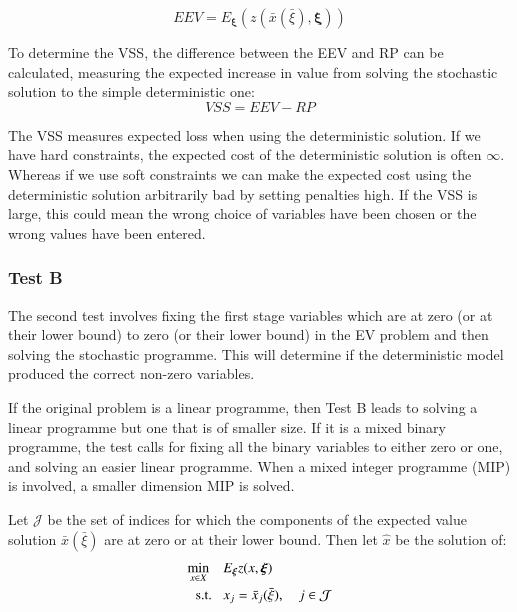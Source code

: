 \documentclass[../thesis.tex]{subfiles}
\begin{document}
\begin{equation}\label{eq:EEV}
    EEV = E_{\boldsymbol{\xi}} (z(\bar x (\bar \xi),\boldsymbol{\xi}))
\end{equation}

To determine the VSS, the difference between the EEV and RP can be calculated, measuring the expected increase in value from solving the stochastic solution to the simple deterministic one:
\begin{equation}\label{eq:VSS}
    VSS = EEV - RP
\end{equation}

The VSS measures expected loss when using the deterministic solution. If we have hard constraints, the expected cost of the deterministic solution is often $\infty$. Whereas if we use soft constraints we can make the expected cost using the deterministic solution arbitrarily bad by setting penalties high. If the VSS is large, this could mean the wrong choice of variables have been chosen or the wrong values have been entered.

\subsubsection{Test B}\label{sec:TestB}
The second test involves fixing the first stage variables which are at zero (or at their lower bound) to zero (or their lower bound) in the EV problem and then solving the stochastic programme. This will determine if the deterministic model produced the correct non-zero variables.

If the original problem is a linear programme, then Test B leads to solving a linear programme but one that is of smaller size. If it is a mixed binary programme, the test calls for fixing all the binary variables to either zero or one, and solving an easier linear programme. When a mixed integer programme (MIP) is involved, a smaller dimension MIP is solved. 

Let $\mathcal{J}$ be the set of indices for which the components of the expected value solution $\bar x(\bar\xi)$ are at zero or at their lower bound. Then let $\hat x$ be the solution of:
\vspace{-.5cm}
\begin{align}
    \min_{x\in X}\enspace\enspace & E_{\boldsymbol{\xi}}z(x,\boldsymbol{\xi}) \notag\\
    \text{s.t. } \enspace & x_{j} =\bar x_{j}(\bar \xi), \enspace \enspace j \in \mathcal{J}
\end{align}
\end{document}
